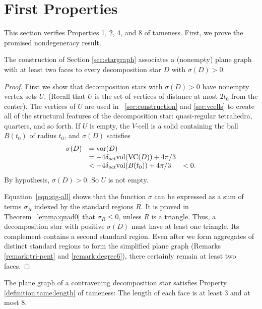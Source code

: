 \section{First Properties}

This section verifies Properties 1, 2, 4, and 8 of tameness.  First,
we prove the promised nondegeneracy result.

\begin{proposition}
\label{prop:nonempty} The construction of Section
\ref{sec:stargraph} associates a (nonempty) plane graph with at
least two faces to every decomposition star $D$ with
$\sigma(D)>0$.
\end{proposition}

\begin{proof}
First we show that decomposition stars with $\sigma(D)>0$ have
nonempty vertex sets $U$. (Recall that $U$ is the set of vertices
of distance at most $2t_0$ from the center).  The vertices of $U$
are used in \Chaps~\ref{sec:construction} and \ref{sec:vcells} to
create all of the structural features of the decomposition star:
quasi-regular tetrahedra, quarters, and so forth. If $U$ is empty,
the $V$-cell is a solid containing the ball $B(t_0)$ of radius
$t_0$, and $\sigma(D)$ satisfies
    $$
    \begin{array}{lll}
    \sigma(D) &= \operatorname{vor}(D)\\
              & = -4\delta_{oct} {\operatorname{vol}}({\operatorname{VC}}(D)) + 4\pi/3 \\
              &< -4\delta_{oct}{\operatorname{vol}}(B(t_0)) + 4\pi/3
              &< 0.
    \end{array}
    $$
By hypothesis, $\sigma(D)>0$.  So $U$ is not empty.

Equation~\ref{eqn:sig-all} shows that the function $\sigma$ can be
expressed as a sum of terms $\sigma_R$ indexed by the standard
regions $R$. It is proved in Theorem~\ref{lemma:quad0} that
$\sigma_R\le0$, unless $R$ is a triangle. Thus, a decomposition
star with positive $\sigma(D)$ must have at least one triangle.
Its complement contains a second standard region. Even after we
form aggregates of distinct standard regions to form the
simplified plane graph (Remarks \ref{remark:tri-pent} and
\ref{remark:degree6}), there certainly remain at least two faces.
\end{proof}

\begin{proposition} The plane graph of a contravening decomposition
star satisfies Property \ref{definition:tame:length} of tameness:
The length of each face is at least $3$ and at most $8$.
\end{proposition}

